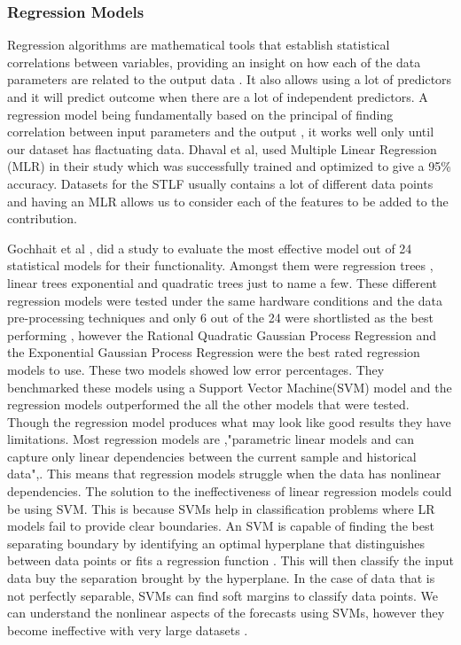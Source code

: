  \subsubsection{Regression Models }

 Regression algorithms are mathematical tools that establish statistical correlations between variables, providing an insight on how each of the data parameters are related to the output data \cite{gochhait2023regression}. It also allows using a lot of predictors and it will predict outcome when there are a lot of independent predictors. A regression model being fundamentally based on the principal of finding correlation between input parameters and the output \cite{vardhan2023comparative}, it works well only until our dataset has flactuating data. Dhaval et al, \cite{Dhaval2020ShorttermLFB} used Multiple Linear Regression (MLR) in their study which was successfully trained and optimized to give a 95\% accuracy. Datasets for the STLF usually contains a lot of different data points and having an MLR allows us to consider each of the features to be added to the contribution.
 
 Gochhait et al ,\cite{gochhait2023regression} did a study to evaluate the most effective model out of 24 statistical models for their functionality. Amongst them were regression trees , linear trees exponential and quadratic trees just to name a few. These different regression models were tested under the same hardware conditions and the data pre-processing techniques and only 6 out of the 24 were shortlisted as the best performing , however the Rational Quadratic Gaussian Process Regression and the Exponential Gaussian Process Regression were the best rated regression models to use. These two models showed low error percentages. They benchmarked these models using a Support Vector Machine(SVM) model and the regression models outperformed the all the other models that were tested. Though the regression model produces what may look like good results they have limitations. Most regression models are ,"parametric linear models and can capture only linear dependencies between the current sample and historical data",\cite{tshipata2024multi}. This means that regression models struggle when the data has nonlinear dependencies. The solution to the ineffectiveness of linear regression models could be using SVM. This is because SVMs help in classification problems where LR models fail to provide clear boundaries. An SVM is capable of finding the best separating boundary by identifying an optimal hyperplane that distinguishes between data points or fits a regression function \cite{hussien2021comparative}. This will then classify the input data buy the separation brought by the hyperplane. In the case of data that is not perfectly separable, SVMs can find soft margins to classify data points. We can understand the nonlinear aspects of the forecasts using SVMs, however they become ineffective with very large datasets \cite{vardhan2023comparative}.
 
